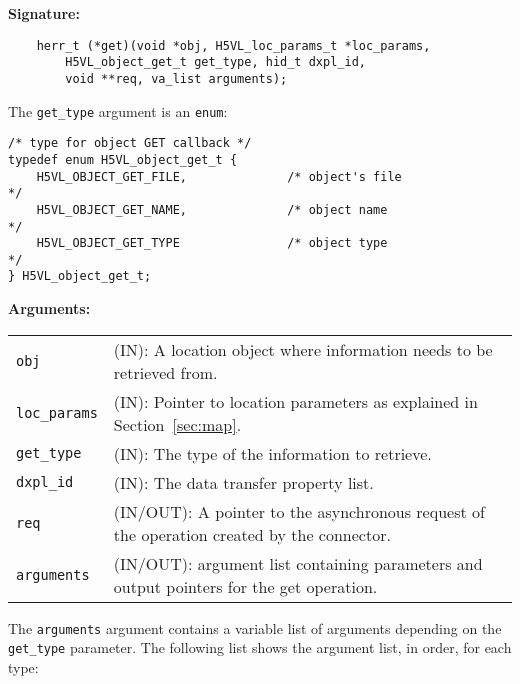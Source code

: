 \begin{mdframed}[style=bgbox]
\textbf{Signature:}
\begin{lstlisting}
    herr_t (*get)(void *obj, H5VL_loc_params_t *loc_params, 
        H5VL_object_get_t get_type, hid_t dxpl_id, 
        void **req, va_list arguments);
\end{lstlisting}

The \texttt{get\_type} argument is an \texttt{enum}:
\begin{lstlisting}
/* type for object GET callback */
typedef enum H5VL_object_get_t {                                                 
    H5VL_OBJECT_GET_FILE,              /* object's file                     */   
    H5VL_OBJECT_GET_NAME,              /* object name                       */   
    H5VL_OBJECT_GET_TYPE               /* object type                       */   
} H5VL_object_get_t; 
\end{lstlisting}

\textbf{Arguments:}\\
\begin{tabular}{l p{13.5cm}}
  \texttt{obj} & (IN): A location object where information needs to be
  retrieved from.\\
  \texttt{loc\_params} & (IN): Pointer to location parameters as
  explained in Section~\ref{sec:map}.\\
  \texttt{get\_type} & (IN): The type of the information to retrieve.\\
  \texttt{dxpl\_id} & (IN): The data transfer property list.\\
  \texttt{req} & (IN/OUT): A pointer to the asynchronous request of the
  operation created by the connector.\\
  \texttt{arguments} & (IN/OUT): argument list containing parameters and
  output pointers for the get operation. \\
\end{tabular}
\end{mdframed}

The \texttt{arguments} argument contains a variable list of arguments
depending on the \texttt{get\_type} parameter. The following list shows
the argument list, in order, for each type:


